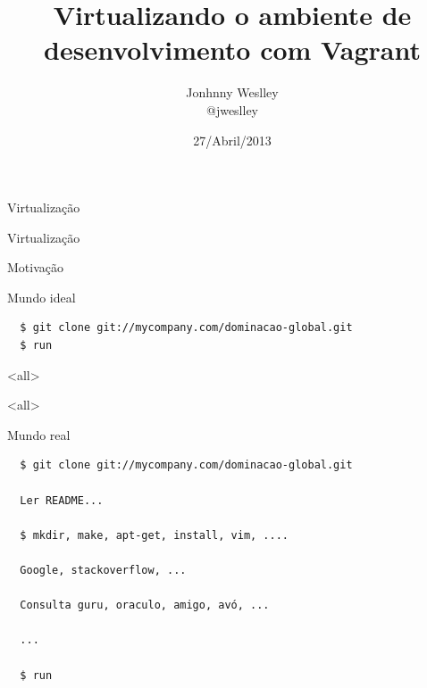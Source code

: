 \documentclass{beamer}
\author{Jonhnny Weslley \\ @jweslley}
\title{Virtualizando o ambiente de desenvolvimento com Vagrant}
\institute{Gurupi \\ Grupo de Usuários de Ruby do Piauí}
\date{27/Abril/2013}
\begin{document}
\begin{frame}[t,plain]
\titlepage
\end{frame}

\begin{frame}[plain,c]
  \begin{center}
    \Huge Virtualização
  \end{center}
\end{frame}

\begin{frame}[plain,c]
  \begin{center}
    \Huge Virtualização
  \end{center}
  \begin{center}
    Motivação
  \end{center}
\end{frame}

\begin{frame}[fragile]{Mundo ideal}
  \begin{verbatim}
  $ git clone git://mycompany.com/dominacao-global.git
  $ run
  \end{verbatim}
\end{frame}

\mode<all>
{
\begin{frame}[plain]
\end{frame}}
\mode<all>{\usebackgroundtemplate{}}
\mode*

\begin{frame}[fragile]{Mundo real}
  \begin{verbatim}
  $ git clone git://mycompany.com/dominacao-global.git

  Ler README...

  $ mkdir, make, apt-get, install, vim, ....

  Google, stackoverflow, ...

  Consulta guru, oraculo, amigo, avó, ...

  ...

  $ run
  \end{verbatim}
\end{frame}
\end{document}
